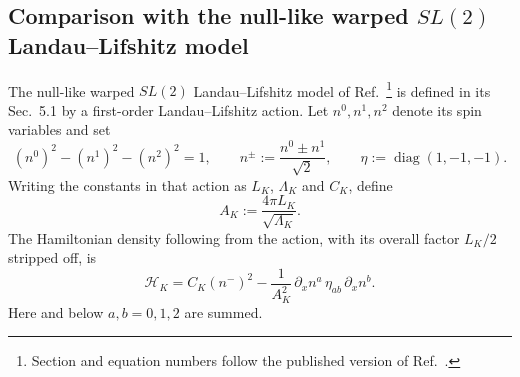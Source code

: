 \subsection{Comparison with the null-like warped \texorpdfstring{$SL(2)$}{SL(2)} Landau--Lifshitz model}
\label{sec:class5-known-null-pair}

The null-like warped $SL(2)$ Landau--Lifshitz model of
Ref.~\cite{KameyamaYoshida2014}\footnote{Section and equation numbers follow the published version of Ref.~\cite{KameyamaYoshida2014}.}
is defined in its Sec.~5.1 by a first-order
Landau--Lifshitz action.  Let $n^0,n^1,n^2$ denote its spin variables and set
\begin{equation}
(n^0)^2-(n^1)^2-(n^2)^2=1,
\qquad
n^{\pm}:=\frac{n^0\pm n^1}{\sqrt2},
\qquad
\eta:=\operatorname{diag}(1,-1,-1).
\label{eq:class5-known-n-fields}
\end{equation}
Writing the constants in that action as $L_K$, $\Lambda_K$ and $C_K$, define
\begin{equation}
A_K:=\frac{4\pi L_K}{\sqrt{\Lambda_K}}.
\label{eq:class5-known-AK}
\end{equation}
The Hamiltonian density following from the action, with its overall factor
$L_K/2$ stripped off, is
\begin{equation}
\mathcal H_K
=C_K(n^-)^2
-\frac{1}{A_K^2}\,
\partial_x n^a\,\eta_{ab}\,\partial_x n^b.
\label{eq:class5-known-HK}
\end{equation}
Here and below $a,b=0,1,2$ are summed.

